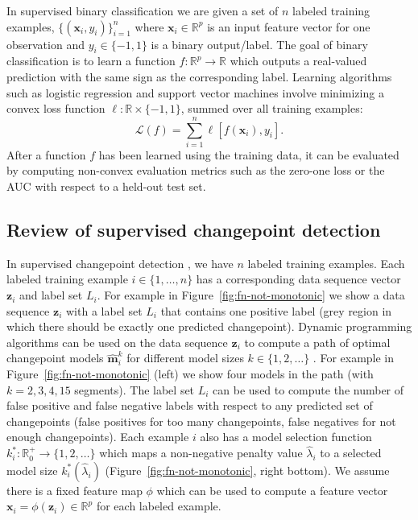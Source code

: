 \documentclass{article}
\begin{document}
In supervised binary classification we are given a set of $n$ labeled training examples, $\{(\mathbf x_i, y_i)\}_{i=1}^n$ where $\mathbf x_i\in\mathbb R^p$ is an input feature vector for one observation and $y_i\in\{-1,1\}$ is a binary output/label.
The goal of binary classification is to learn a function $f:\mathbb R^p\rightarrow \mathbb R$ which outputs a real-valued prediction with the same sign as the corresponding label.
Learning algorithms such as logistic regression and support vector machines involve minimizing a convex loss function $\ell:\mathbb R\times \{-1,1\}$, summed over all training examples:
\begin{equation}
\label{eq:loss-sum-over-examples}
    \mathcal L(f) =  \sum_{i=1}^n \ell[ f(\mathbf x_i), y_i].
\end{equation}
After a function $f$ has been learned using the training data, it can be evaluated by computing non-convex evaluation metrics such as the zero-one loss or the AUC with respect to a held-out test set.

\subsection{Review of supervised changepoint detection}

In supervised changepoint detection \citep{Hocking2013icml}, we have  $n$ labeled training examples. 
Each labeled training example $i\in\{1,\dots,n\}$ has a corresponding data sequence vector $\mathbf z_i$ and label set $L_i$.
For example in Figure~\ref{fig:fn-not-monotonic} we show a data sequence $\mathbf z_i$ with a label set $L_i$ that contains one positive label (grey region in which there should be exactly one predicted changepoint).
Dynamic programming algorithms can be used on the data sequence $\mathbf z_i$ to compute a path of optimal changepoint models $\mathbf {\hat m}^k_i$ for different model sizes $k\in\{1,2,\dots\}$  \citep{Maidstone2016}.
For example in Figure~\ref{fig:fn-not-monotonic} (left) we show four models in the path (with $k=2,3,4,15$ segments).
The label set $L_i$ can be used to compute the number of false positive and false negative labels with respect to any predicted set of changepoints (false positives for too many changepoints, false negatives for not enough changepoints).
Each example $i$ also has a model selection function $k^*_i:\mathbb R^+_0 \rightarrow \{1,2,\dots\}$ which maps a non-negative penalty value $\hat \lambda_i$ to a selected model size $k^*_i(\hat \lambda_i)$ (Figure~\ref{fig:fn-not-monotonic}, right bottom).
We assume there is a fixed feature map $\phi$ which can be used to compute a feature vector $\mathbf x_i = \phi(\mathbf z_i)\in\mathbb R^p$ for each labeled example.
\end{document}
